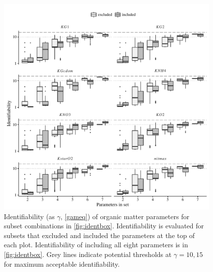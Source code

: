 \documentclass[letterpaper,12pt,oneside]{article}\usepackage[]{graphicx}\usepackage[]{color}
\begin{document}
\begin{figure}[!ht]

{\centering \includegraphics[width=\textwidth]{figs/exclex-1} 

}

\caption{Identifiability (as $\gamma$, \cref{gameq}) of organic matter parameters for subset combinations in \cref{fig:identbox}.  Identifiability is evaluated for subsets that excluded and included the parameters at the top of each plot. Identifiability of including all eight parameters is in \cref{fig:identbox}. Grey lines indicate potential thresholds at $\gamma = 10, 15$ for maximum acceptable identifiability.}\label{fig:exclex}
\end{figure}
\end{document}
